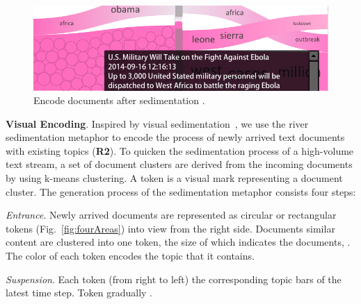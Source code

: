 \begin{figure}[b]
	\vspace{-3mm}
	\centering
	\includegraphics[width=\columnwidth]{fig/vtreemap}
	\vspace{-5mm}
	\caption{
	Encode documents after sedimentation .
	}
	\label{fig:vtreemap}
\end{figure}


\noindent \textbf{\normalsize Visual Encoding}.
Inspired by visual sedimentation~\cite{Huron2013visual}, we use the river sedimentation metaphor to encode the process of newly arrived text documents  with existing topics (\textbf{\normalsize R2}).
To quicken the sedimentation process of a high-volume text stream, a set of document clusters are derived from the incoming documents by using k-means clustering.
A token is a visual mark representing a document cluster.
The generation process of the sedimentation metaphor consists  four steps:

\emph{\normalsize Entrance}.
Newly arrived documents are represented as circular or rectangular tokens (Fig.~\ref{fig:fourAreas})  into view from the right side.
Documents  similar content are clustered into one token, the size of which indicates the  documents, .
The color of each token encodes the topic that it contains.

\emph{\normalsize Suspension}.
Each token  (from right to left) the corresponding topic bars of the latest time step.
Token   gradually .

